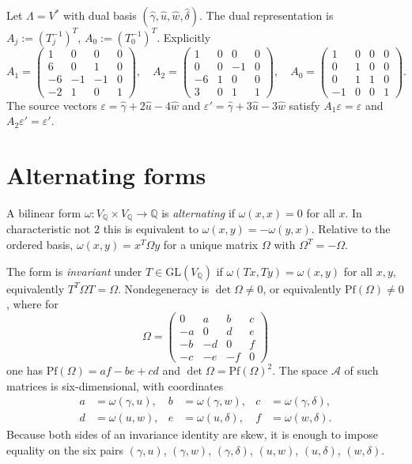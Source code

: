 \documentclass[11pt,a4paper]{article}
\theoremstyle{definition}
\theoremstyle{remark}
\newcommand{\Q}{\mathbb{Q}}
\newcommand{\Pf}{\mathrm{Pf}}
\begin{document}
Let $\Lambda=V^*$ with dual basis $(\hat\gamma,\hat u,\hat w,\hat\delta)$. The dual representation is $A_j:=(T_j^{-1})^T$, $A_0:=(T_0^{-1})^T$. Explicitly
\[
A_1=\begin{pmatrix}1&0&0&0\\6&0&1&0\\-6&-1&-1&0\\-2&1&0&1\end{pmatrix},\quad
A_2=\begin{pmatrix}1&0&0&0\\0&0&-1&0\\-6&1&0&0\\3&0&1&1\end{pmatrix},\quad
A_0=\begin{pmatrix}1&0&0&0\\0&1&0&0\\0&1&1&0\\-1&0&0&1\end{pmatrix}.
\]
The source vectors $\varepsilon=\hat\gamma+2\hat u-4\hat w$ and $\varepsilon'=\hat\gamma+3\hat u-3\hat w$ satisfy $A_1\varepsilon=\varepsilon$ and $A_2\varepsilon'=\varepsilon'$.

\section{Alternating forms}

A bilinear form $\omega:V_{\Q}\times V_{\Q}\to\Q$ is \emph{alternating} if $\omega(x,x)=0$ for all $x$. In characteristic not $2$ this is equivalent to $\omega(x,y)=-\omega(y,x)$. Relative to the ordered basis, $\omega(x,y)=x^T\Omega y$ for a unique matrix $\Omega$ with $\Omega^T=-\Omega$.

The form is \emph{invariant} under $T\in\mathrm{GL}(V_{\Q})$ if $\omega(Tx,Ty)=\omega(x,y)$ for all $x,y$, equivalently $T^T\Omega T=\Omega$. Nondegeneracy is $\det\Omega\neq 0$, or equivalently $\Pf(\Omega)\neq 0$, where for
\[
\Omega=\begin{pmatrix}0&a&b&c\\-a&0&d&e\\-b&-d&0&f\\-c&-e&-f&0\end{pmatrix}
\]
one has $\Pf(\Omega)=af-be+cd$ and $\det\Omega=\Pf(\Omega)^2$. The space $\mathcal{A}$ of such matrices is six-dimensional, with coordinates
\begin{align*}
a&=\omega(\gamma,u),&
b&=\omega(\gamma,w),&
c&=\omega(\gamma,\delta),\\
d&=\omega(u,w),&
e&=\omega(u,\delta),&
f&=\omega(w,\delta).
\end{align*}
Because both sides of an invariance identity are skew, it is enough to impose equality on the six pairs $(\gamma,u)$, $(\gamma,w)$, $(\gamma,\delta)$, $(u,w)$, $(u,\delta)$, $(w,\delta)$.
\end{document}
